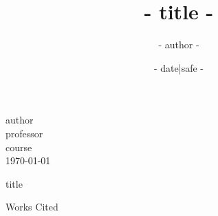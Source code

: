 \documentclass[12pt]{scrartcl} %
\title{ {{- title -}} }
\author{ {{- author -}} }
\date{ {{- date|safe -}} }
\begin{document}
\begin{flushleft}
  {{ author }}\\
  {{ professor }}\\
  {{ course }}\\
  \today\\
\end{flushleft}

\begin{center}
  {{ title }}
\end{center}

%
%

\clearpage
\begin{center}
  Works Cited
\end{center}
\printbibliography[heading=none]
\end{document}
